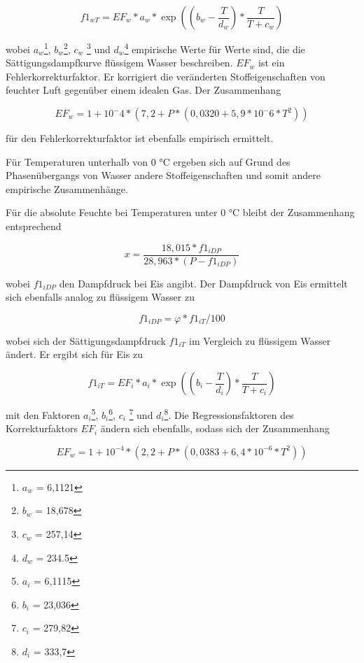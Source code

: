 \begin{equation}
f1_{wT}=EF_{w}*a_{w}*\exp((b_{w}-\frac{T}{d_{w}})*\frac{T}{T+c_{w}})
\end{equation}

wobei $a_{w}$\footnote{$a_{w}$ = 6,1121}, $b_{w}$\footnote{$b_{w}$ = 18,678}, $c_{w}$ \footnote{$c_{w}$ = 257,14} und $d_{w}$\footnote{$d_{w}$ = 234.5} empirische Werte für Werte sind, die die Sättigungsdampfkurve flüssigem Wasser beschreiben. $EF_{w}$ ist ein Fehlerkorrekturfaktor. Er korrigiert die veränderten Stoffeigenschaften von feuchter Luft gegenüber einem idealen Gas. Der Zusammenhang 

\begin{equation}
EF_{w}=1+10^-4*(7,2+P*(0,0320+5,9*10^-6*T^2))
\end{equation}

für den Fehlerkorrekturfaktor ist ebenfalls empirisch ermittelt.

Für Temperaturen unterhalb von 0 °C ergeben sich auf Grund des Phasenübergangs von Wasser andere Stoffeigenschaften und somit andere empirische Zusammenhänge. 


Für die absolute Feuchte bei Temperaturen unter 0 °C bleibt der Zusammenhang entsprechend

\begin{equation}
 x=\frac{18,015*f1_{iDP}}{28,963*(P-f1_{iDP})}
\end{equation}

wobei $f1_{iDP}$ den Dampfdruck bei Eis angibt. Der Dampfdruck von Eis ermittelt sich ebenfalls analog zu flüssigem Wasser zu

\begin{equation}
f1_{iDP}=\varphi*f1_{iT}/100
\end{equation}

wobei sich der Sättigungsdampfdruck $f1_{iT}$ im Vergleich zu flüssigem Wasser ändert. Er ergibt sich für Eis zu


\begin{equation}
f1_{iT}=EF_{i}*a_{i}*\exp((b_{i}-\frac{T}{d_{i}})*\frac{T}{T+c_{i}})
\end{equation}

mit den Faktoren $a_{i}$\footnote{$a_{i}$ = 6,1115}, $b_{i}$\footnote{$b_{i}$ = 23,036}, $c_{i}$ \footnote{$c_{i}$ = 279,82} und $d_{i}$\footnote{$d_{i}$ = 333,7}. Die Regressionsfaktoren des Korrekturfaktors $EF_{i}$ ändern sich ebenfalls, sodass sich der Zusammenhang 

\begin{equation}
EF_{w}=1+10^{-4}*(2,2+P*(0,0383+6,4*10^{-6}*T^2))
\end{equation}

